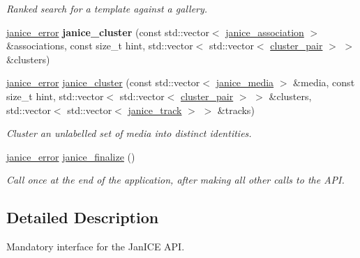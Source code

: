\begin{DoxyCompactItemize}
\begin{DoxyCompactList}\small\item\em Ranked search for a template against a gallery. \end{DoxyCompactList}\item 
\hypertarget{group__janice_ga450b79682e7edd69ff753462375eb3bf}{}\hyperlink{group__janice_ga4873d49c1f9d6a6880dfbd485cf6ba72}{janice\+\_\+error} {\bfseries janice\+\_\+cluster} (const std\+::vector$<$ \hyperlink{structjanice__association}{janice\+\_\+association} $>$ \&associations, const size\+\_\+t hint, std\+::vector$<$ std\+::vector$<$ \hyperlink{group__janice_ga469e8635dece2be63e8871ed3e2b2f4c}{cluster\+\_\+pair} $>$ $>$ \&clusters)\label{group__janice_ga450b79682e7edd69ff753462375eb3bf}

\item 
\hyperlink{group__janice_ga4873d49c1f9d6a6880dfbd485cf6ba72}{janice\+\_\+error} \hyperlink{group__janice_ga9696667941fe25bd7ddf7623a1723cb2}{janice\+\_\+cluster} (const std\+::vector$<$ \hyperlink{structjanice__media}{janice\+\_\+media} $>$ \&media, const size\+\_\+t hint, std\+::vector$<$ std\+::vector$<$ \hyperlink{group__janice_ga469e8635dece2be63e8871ed3e2b2f4c}{cluster\+\_\+pair} $>$ $>$ \&clusters, std\+::vector$<$ std\+::vector$<$ \hyperlink{structjanice__track}{janice\+\_\+track} $>$ $>$ \&tracks)
\begin{DoxyCompactList}\small\item\em Cluster an unlabelled set of media into distinct identities. \end{DoxyCompactList}\item 
\hyperlink{group__janice_ga4873d49c1f9d6a6880dfbd485cf6ba72}{janice\+\_\+error} \hyperlink{group__janice_ga3a2f0366f897c1168639b152b2cdf554}{janice\+\_\+finalize} ()
\begin{DoxyCompactList}\small\item\em Call once at the end of the application, after making all other calls to the A\+P\+I. \end{DoxyCompactList}\end{DoxyCompactItemize}


\subsection{Detailed Description}
Mandatory interface for the Jan\+I\+C\+E A\+P\+I. 

